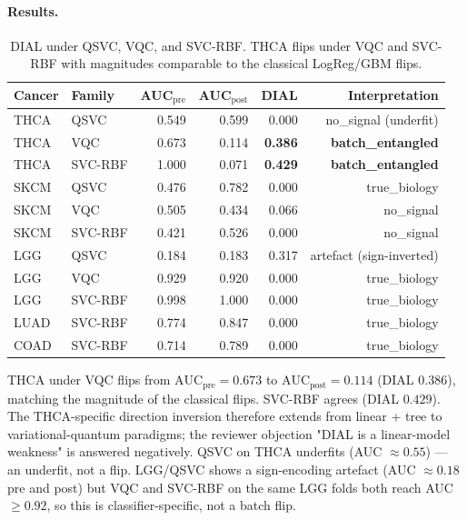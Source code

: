 \documentclass[11pt,a4paper]{article}
\begin{document}
\paragraph{Results.}
\begin{table}[htbp]
\centering
\small
\begin{tabular}{llrrrr}\toprule
Cancer & Family & AUC$_{\mathrm{pre}}$ & AUC$_{\mathrm{post}}$ & DIAL & Interpretation \\ \midrule
THCA & QSVC     & 0.549 & 0.599 & 0.000 & no\_signal (underfit) \\
THCA & VQC      & 0.673 & 0.114 & \textbf{0.386} & \textbf{batch\_entangled} \\
THCA & SVC-RBF  & 1.000 & 0.071 & \textbf{0.429} & \textbf{batch\_entangled} \\
SKCM & QSVC     & 0.476 & 0.782 & 0.000 & true\_biology \\
SKCM & VQC      & 0.505 & 0.434 & 0.066 & no\_signal \\
SKCM & SVC-RBF  & 0.421 & 0.526 & 0.000 & no\_signal \\
LGG  & QSVC     & 0.184 & 0.183 & 0.317 & artefact (sign-inverted) \\
LGG  & VQC      & 0.929 & 0.920 & 0.000 & true\_biology \\
LGG  & SVC-RBF  & 0.998 & 1.000 & 0.000 & true\_biology \\
LUAD & SVC-RBF  & 0.774 & 0.847 & 0.000 & true\_biology \\
COAD & SVC-RBF  & 0.714 & 0.789 & 0.000 & true\_biology \\
\bottomrule\end{tabular}
\caption{DIAL under QSVC, VQC, and SVC-RBF. THCA flips under VQC and
SVC-RBF with magnitudes comparable to the classical LogReg/GBM flips.}
\label{tab:s6}
\end{table}

THCA under VQC flips from $\mathrm{AUC}_{\mathrm{pre}}=0.673$ to
$\mathrm{AUC}_{\mathrm{post}}=0.114$ (DIAL $0.386$), matching the
magnitude of the classical flips. SVC-RBF agrees (DIAL $0.429$). The
THCA-specific direction inversion therefore extends from linear +
tree to variational-quantum paradigms; the reviewer objection "DIAL
is a linear-model weakness" is answered negatively. QSVC on THCA
underfits (AUC $\approx 0.55$) --- an underfit, not a flip. LGG/QSVC
shows a sign-encoding artefact (AUC $\approx 0.18$ pre and post) but
VQC and SVC-RBF on the same LGG folds both reach AUC $\geq 0.92$, so
this is classifier-specific, not a batch flip.
\end{document}
